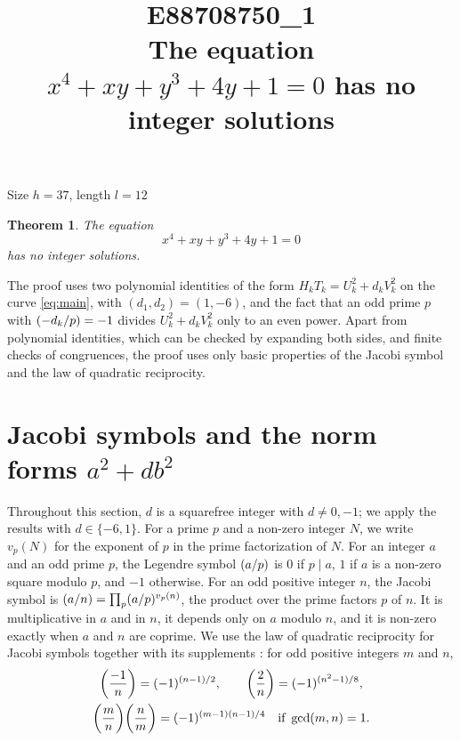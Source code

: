 \documentclass[11pt]{article}
\title{\textbf{E88708750\_1}\\[4pt] {\Large The equation $x^{4}+xy+y^{3}+4y+1=0$ has no integer solutions}}
\author{}
\date{}
\newtheorem{theorem}{Theorem}
\newcommand{\leg}[2]{\mathchoice{\biggl(\dfrac{#1}{#2}\biggr)}{(#1/#2)}{(#1/#2)}{(#1/#2)}}
\begin{document}
\maketitle
\vspace{-8ex}
\begin{center}
Size $h=37$, length $l=12$
\end{center}

\begin{theorem}\label{thm:main}
The equation
\begin{equation}\label{eq:main}
x^{4}+xy+y^{3}+4y+1=0
\end{equation}
has no integer solutions.
\end{theorem}

The proof uses two polynomial identities of the form $H_kT_k=U_k^2+d_kV_k^2$ on the curve \eqref{eq:main}, with $(d_1,d_2)=(1,-6)$, and the fact that an odd prime $p$ with $\leg{-d_k}{p}=-1$ divides $U_k^2+d_kV_k^2$ only to an even power. Apart from polynomial identities, which can be checked by expanding both sides, and finite checks of congruences, the proof uses only basic properties of the Jacobi symbol and the law of quadratic reciprocity.

\section{Jacobi symbols and the norm forms $a^2+db^2$}

Throughout this section, $d$ is a squarefree integer with $d\neq0,-1$; we apply the results with $d\in\{-6,1\}$. For a prime $p$ and a non-zero integer $N$, we write $v_p(N)$ for the exponent of $p$ in the prime factorization of $N$. For an integer $a$ and an odd prime $p$, the Legendre symbol $\leg{a}{p}$ is $0$ if $p\mid a$, $1$ if $a$ is a non-zero square modulo $p$, and $-1$ otherwise. For an odd positive integer $n$, the Jacobi symbol is $\leg{a}{n}=\prod_p\leg{a}{p}^{v_p(n)}$, the product over the prime factors $p$ of $n$. It is multiplicative in $a$ and in $n$, it depends only on $a$ modulo $n$, and it is non-zero exactly when $a$ and $n$ are coprime. We use the law of quadratic reciprocity for Jacobi symbols together with its supplements \cite[Chapter~5, \S2]{IR}: for odd positive integers $m$ and $n$,
\begin{gather*}
\leg{-1}{n}=(-1)^{(n-1)/2},\qquad\leg{2}{n}=(-1)^{(n^2-1)/8},\\
\leg{m}{n}\leg{n}{m}=(-1)^{(m-1)(n-1)/4}\quad\text{if }\gcd(m,n)=1.
\end{gather*}
\end{document}

